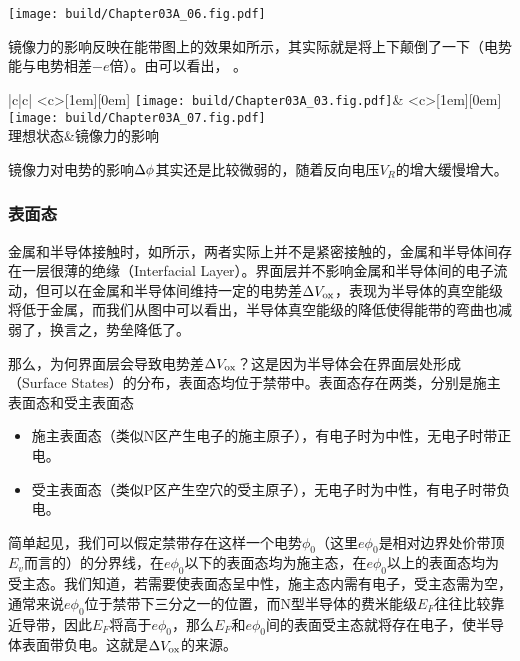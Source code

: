 \begin{Figure}[镜像力对电势曲线的影响]
    \texttt{[image: build/Chapter03A\_06.fig.pdf]}
\end{Figure}

镜像力的影响反映在能带图上的效果如所示，其实际就是将上下颠倒了一下（电势能与电势相差$-e$倍）。由可以看出，
。

\begin{Table}[镜像力对势垒的影响]{|c|c|}
    \xcell<c>[1em][0em]
    {\texttt{[image: build/Chapter03A\_03.fig.pdf]}}&
    \xcell<c>[1em][0em]
    {\texttt{[image: build/Chapter03A\_07.fig.pdf]}}\\
    理想状态&镜像力的影响\\
\end{Table}

镜像力对电势的影响$\Delta{\phi}$其实还是比较微弱的，随着反向电压$V_R$的增大缓慢增大。

\subsubsection{表面态}
金属和半导体接触时，如所示，两者实际上并不是紧密接触的，金属和半导体间存在一层很薄的绝缘（Interfacial Layer）。界面层并不影响金属和半导体间的电子流动，但可以在金属和半导体间维持一定的电势差$\Delta{V_{\text{ox}}}$，表现为半导体的真空能级将低于金属，而我们从图中可以看出，半导体真空能级的降低使得能带的弯曲也减弱了，换言之，势垒降低了。

那么，为何界面层会导致电势差$\Delta{V_{\text{ox}}}$？这是因为半导体会在界面层处形成（Surface States）的分布，表面态均位于禁带中。表面态存在两类，分别是施主表面态和受主表面态
\begin{itemize}
    \item 施主表面态（类似N区产生电子的施主原子），有电子时为中性，无电子时带正电。
    \item 受主表面态（类似P区产生空穴的受主原子），无电子时为中性，有电子时带负电。
\end{itemize}
简单起见，我们可以假定禁带存在这样一个电势$\phi_0$（这里$e\phi_0$是相对边界处价带顶$E_v$而言的）的分界线，在$e\phi_0$以下的表面态均为施主态，在$e\phi_0$以上的表面态均为受主态。我们知道，若需要使表面态呈中性，施主态内需有电子，受主态需为空，通常来说$e\phi_0$位于禁带下三分之一的位置，而N型半导体的费米能级$E_F$往往比较靠近导带，因此$E_F$将高于$e\phi_0$，那么$E_F$和$e\phi_0$间的表面受主态就将存在电子，使半导体表面带负电。这就是$\Delta{V_{\text{ox}}}$的来源。

